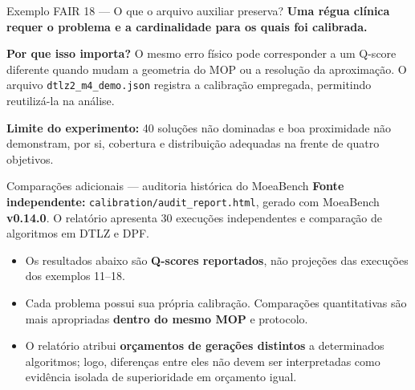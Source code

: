 \begin{frame}{Exemplo FAIR 18 — O que o arquivo auxiliar preserva?}
\textbf{Uma régua clínica requer o problema e a cardinalidade para os quais foi calibrada.}\par\medskip
\begin{center}
\end{center}
\vspace{.20cm}
\textbf{Por que isso importa?} O mesmo erro físico pode corresponder a um Q-score diferente quando mudam a geometria do MOP ou a resolução da aproximação. O arquivo \texttt{dtlz2\_m4\_demo.json} registra a calibração empregada, permitindo reutilizá-la na análise.
\par\medskip
\textbf{Limite do experimento:} 40 soluções não dominadas e boa proximidade não demonstram, por si, cobertura e distribuição adequadas na frente de quatro objetivos.
\end{frame}

\begin{frame}{Comparações adicionais — auditoria histórica do MoeaBench}
\textbf{Fonte independente:} \texttt{calibration/audit\_report.html}, gerado com MoeaBench \textbf{v0.14.0}. O relatório apresenta 30 execuções independentes e comparação de algoritmos em DTLZ e DPF.
\par\medskip
\begin{itemize}
\item Os resultados abaixo são \textbf{Q-scores reportados}, não projeções das execuções dos exemplos 11--18.
\item Cada problema possui sua própria calibração. Comparações quantitativas são mais apropriadas \textbf{dentro do mesmo MOP} e protocolo.
\item O relatório atribui \textbf{orçamentos de gerações distintos} a determinados algoritmos; logo, diferenças entre eles não devem ser interpretadas como evidência isolada de superioridade em orçamento igual.
\end{itemize}

\end{frame}

